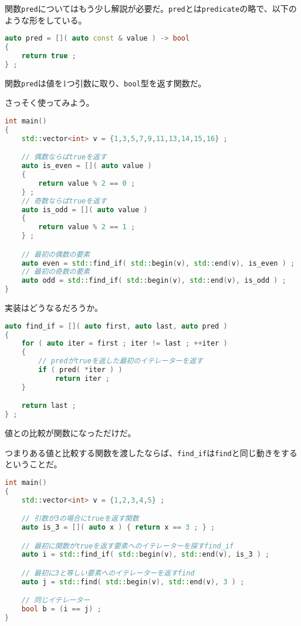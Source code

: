 関数\texttt{pred}についてはもう少し解説が必要だ。\texttt{pred}とは\texttt{predicate}の略で、以下のような形をしている。

\begin{lstlisting}[language={C++}]
auto pred = []( auto const & value ) -> bool
{
    return true ;
} ;
\end{lstlisting}

関数\texttt{pred}は値を1つ引数に取り、\texttt{bool}型を返す関数だ。

さっそく使ってみよう。

\begin{lstlisting}[language={C++}]
int main()
{
    std::vector<int> v = {1,3,5,7,9,11,13,14,15,16} ;

    // 偶数ならばtrueを返す
    auto is_even = []( auto value )
    {
        return value % 2 == 0 ;
    } ;
    // 奇数ならばtrueを返す
    auto is_odd = []( auto value )
    {
        return value % 2 == 1 ;
    } ;

    // 最初の偶数の要素
    auto even = std::find_if( std::begin(v), std::end(v), is_even ) ;
    // 最初の奇数の要素
    auto odd = std::find_if( std::begin(v), std::end(v), is_odd ) ;
}
\end{lstlisting}

実装はどうなるだろうか。

\begin{lstlisting}[language={C++}]
auto find_if = []( auto first, auto last, auto pred )
{
    for ( auto iter = first ; iter != last ; ++iter )
    {
        // predがtrueを返した最初のイテレーターを返す
        if ( pred( *iter ) )
            return iter ;
    }

    return last ;
} ;
\end{lstlisting}

値との比較が関数になっただけだ。

つまりある値と比較する関数を渡したならば、\texttt{find\_if}は\texttt{find}と同じ動きをするということだ。

\ifTombow\pagebreak\fi
\begin{lstlisting}[language={C++}]
int main()
{
    std::vector<int> v = {1,2,3,4,5} ;

    // 引数が3の場合にtrueを返す関数
    auto is_3 = []( auto x ) { return x == 3 ; } ;

    // 最初に関数がtrueを返す要素へのイテレーターを探すfind_if
    auto i = std::find_if( std::begin(v), std::end(v), is_3 ) ;

    // 最初に3と等しい要素へのイテレーターを返すfind
    auto j = std::find( std::begin(v), std::end(v), 3 ) ;

    // 同じイテレーター
    bool b = (i == j) ;
}
\end{lstlisting}

